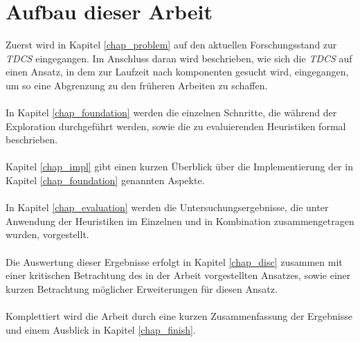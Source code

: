 \section{Aufbau dieser Arbeit}
Zuerst wird in Kapitel \ref{chap_problem} auf den aktuellen Forschungsstand zur \emph{TDCS} eingegangen. Im Anschluss daran wird beschrieben, wie sich die \emph{TDCS} auf einen Ansatz, in dem zur Laufzeit nach \gls{komponente}n gesucht wird, eingegangen, um so eine Abgrenzung zu den früheren Arbeiten zu schaffen.
\\\\
In Kapitel \ref{chap_foundation} werden die einzelnen Schnritte, die während der Exploration durchgeführt werden, sowie die zu evaluierenden Heuristiken formal beschrieben.
\\\\
Kapitel \ref{chap_impl} gibt einen kurzen Überblick über die Implementierung der in Kapitel \ref{chap_foundation} genannten Aspekte.
\\\\
In Kapitel \ref{chap_evaluation} werden die Untersuchungsergebnisse, die unter Anwendung der Heuristiken im Einzelnen und in Kombination zusammengetragen wurden, vorgestellt. 
\\\\
Die Auswertung dieser Ergebnisse erfolgt in Kapitel \ref{chap_disc} zusammen mit einer kritischen Betrachtung des in der Arbeit vorgestellten Ansatzes, sowie einer kurzen Betrachtung möglicher Erweiterungen für diesen Ansatz.
\\\\
Komplettiert wird die Arbeit durch eine kurzen Zusammenfassung der Ergebnisse und einem Ausblick in Kapitel \ref{chap_finish}.
%